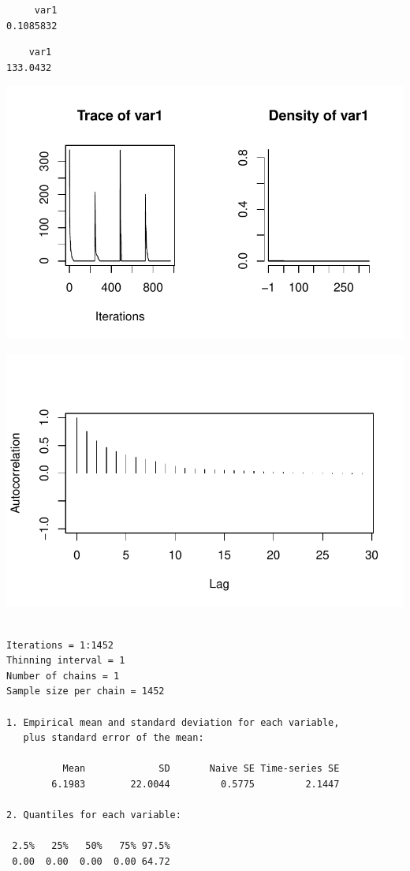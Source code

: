 \documentclass[
  letterpaper,
  DIV=11,
  numbers=noendperiod]{scrartcl}
\begin{document}
\begin{verbatim}
     var1 
0.1085832 
\end{verbatim}

\begin{verbatim}
    var1 
133.0432 
\end{verbatim}

\includegraphics{Main_files/figure-pdf/unnamed-chunk-13-1.pdf}

\includegraphics{Main_files/figure-pdf/unnamed-chunk-13-2.pdf}

\begin{verbatim}

Iterations = 1:1452
Thinning interval = 1 
Number of chains = 1 
Sample size per chain = 1452 

1. Empirical mean and standard deviation for each variable,
   plus standard error of the mean:

          Mean             SD       Naive SE Time-series SE 
        6.1983        22.0044         0.5775         2.1447 

2. Quantiles for each variable:

 2.5%   25%   50%   75% 97.5% 
 0.00  0.00  0.00  0.00 64.72 
\end{verbatim}
\end{document}
